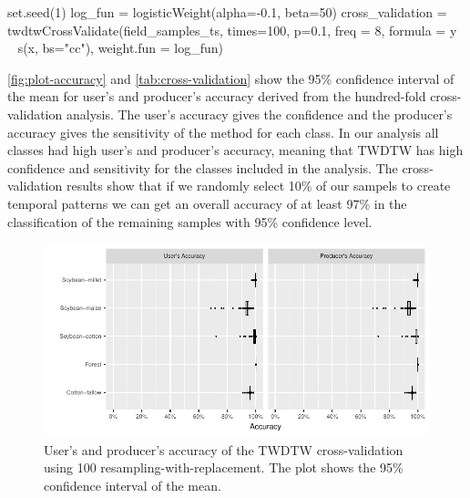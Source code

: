\documentclass[article,shortnames]{jss}
\begin{document}
\begin{CodeChunk}
\begin{CodeInput}
set.seed(1)
log_fun = logisticWeight(alpha=-0.1, beta=50) 
cross_validation = twdtwCrossValidate(field_samples_ts, times=100, p=0.1, 
  freq = 8, formula = y ~ s(x, bs="cc"), weight.fun = log_fun)
\end{CodeInput}
\end{CodeChunk}

\autoref{fig:plot-accuracy} and \autoref{tab:cross-validation} show the
95\% confidence interval of the mean for user's and producer's accuracy
derived from the hundred-fold cross-validation analysis. The user's
accuracy gives the confidence and the producer's accuracy gives the
sensitivity of the method for each class. In our analysis all classes
had high user's and producer's accuracy, meaning that TWDTW has high
confidence and sensitivity for the classes included in the analysis. The
cross-validation results show that if we randomly select 10\% of our
sampels to create temporal patterns we can get an overall accuracy of at
least 97\% in the classification of the remaining samples with 95\%
confidence level.

\begin{CodeChunk}
\begin{figure}[!ht]

{\centering \includegraphics{applying_twdtw_files/figure-latex/plot-accuracy-1} 

}

\caption[User's and producer's accuracy of the TWDTW cross-validation using 100 resampling-with-replacement]{User's and producer's accuracy of the TWDTW cross-validation using 100 resampling-with-replacement. The plot shows the 95\% confidence interval of the mean.}\label{fig:plot-accuracy}
\end{figure}
\end{CodeChunk}
\end{document}
